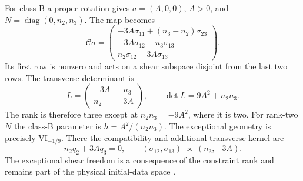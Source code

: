 For class B a proper rotation gives $a=(A,0,0)$, $A>0$, and $N=\operatorname{diag}(0,n_2,n_3)$. The map becomes
\begin{equation}
 \mathcal C\sigma=
 \begin{pmatrix}
 -3A\sigma_{11}+(n_3-n_2)\sigma_{23}\\
 -3A\sigma_{12}-n_3\sigma_{13}\\
 n_2\sigma_{12}-3A\sigma_{13}
 \end{pmatrix}.
 \label{geo:classB}
\end{equation}
Its first row is nonzero and acts on a shear subspace disjoint from the last two rows. The transverse determinant is
\begin{equation}
 L=\begin{pmatrix}-3A&-n_3\\n_2&-3A\end{pmatrix},\qquad
 \det L=9A^2+n_2n_3.
 \label{geo:exceptional_determinant}
\end{equation}
The rank is therefore three except at $n_2n_3=-9A^2$, where it is two. For rank-two $N$ the class-B parameter is $h=A^2/(n_2n_3)$. The exceptional geometry is precisely $\mathrm{VI}_{-1/9}$. There the compatibility and additional transverse kernel are
\begin{equation}
 n_2q_2+3Aq_3=0,\qquad
 (\sigma_{12},\sigma_{13})\ \propto\ (n_3,-3A).
 \label{geo:exceptional_range}
\end{equation}
The exceptional shear freedom is a consequence of the constraint rank and remains part of the physical initial-data space \cite{Hervik2008}.

